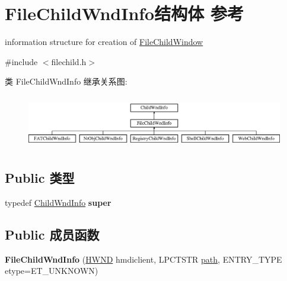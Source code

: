 \hypertarget{struct_file_child_wnd_info}{}\section{File\+Child\+Wnd\+Info结构体 参考}
\label{struct_file_child_wnd_info}


information structure for creation of \hyperlink{struct_file_child_window}{File\+Child\+Window}  




{\ttfamily \#include $<$filechild.\+h$>$}

类 File\+Child\+Wnd\+Info 继承关系图\+:\begin{figure}[H]
\begin{center}
\leavevmode
\includegraphics[height=2.382979cm]{struct_file_child_wnd_info}
\end{center}
\end{figure}
\subsection*{Public 类型}
\begin{DoxyCompactItemize}
\item 
\mbox{\label{struct_file_child_wnd_info_a00291ce2383ea8337c2de34836e04d75}} 
typedef \hyperlink{struct_child_wnd_info}{Child\+Wnd\+Info} {\bfseries super}
\end{DoxyCompactItemize}
\subsection*{Public 成员函数}
\begin{DoxyCompactItemize}
\item 
\mbox{\label{struct_file_child_wnd_info_a18d8705250656127475391464b95beb0}} 
{\bfseries File\+Child\+Wnd\+Info} (\hyperlink{interfacevoid}{H\+W\+ND} hmdiclient, L\+P\+C\+T\+S\+TR \hyperlink{structpath}{path}, E\+N\+T\+R\+Y\+\_\+\+T\+Y\+PE etype=E\+T\+\_\+\+U\+N\+K\+N\+O\+WN)
\end{DoxyCompactItemize}
